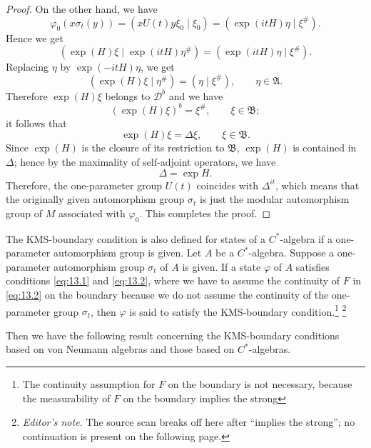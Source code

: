 \documentclass[12pt,b5paper,twoside]{article}
\theoremstyle{takesaki}
\numberwithin{equation}{section}
\newcounter{editorialnote}
\newcommand{\ednote}[1]{%
  \stepcounter{editorialnote}%
  \begingroup
  \renewcommand{\thefootnote}{E\arabic{editorialnote}}%
  \footnote{\textit{Editor's note.} #1}%
  \addtocounter{footnote}{-1}%
  \endgroup
}
\begin{document}
\begin{proof}
On the other hand, we have
\[
 \varphi_0(x\sigma_t(y))
 =(xU(t)y\xi_0\mid\xi_0)
 =(\exp(itH)\eta\mid\xi^{\#}).
\]
Hence we get
\[
 (\exp(H)\xi\mid\exp(itH)\eta^{\#})
 =(\exp(itH)\eta\mid\xi^{\#}).
\]
Replacing $\eta$ by $\exp(-itH)\eta$, we get
\[
 (\exp(H)\xi\mid\eta^{\#})=(\eta\mid\xi^{\#}),
 \qquad \eta\in\mathfrak A.
\]
Therefore $\exp(H)\xi$ belongs to $\mathcal D^b$ and we have
\[
  (\exp(H)\xi)^b=\xi^{\#},
  \qquad \xi\in\mathfrak B;
\]
it follows that
\begin{equation}
  \exp(H)\xi=\Delta\xi,
  \qquad \xi\in\mathfrak B.
  \tag{13.7}\label{eq:13.7}
\end{equation}
Since $\exp(H)$ is the closure of its restriction to $\mathfrak B$,
$\exp(H)$ is contained in $\Delta$; hence by the maximality of
self-adjoint operators, we have
\begin{equation}
  \Delta=\exp H.
  \tag{13.8}\label{eq:13.8}
\end{equation}
Therefore, the one-parameter group $U(t)$ coincides with
$\Delta^{it}$, which means that the originally given automorphism
group $\sigma_t$ is just the modular automorphism group of $M$
associated with $\varphi_0$.  This completes the proof.
\end{proof}

The KMS-boundary condition is also defined for states of a
$C^*$-algebra if a one-parameter automorphism group is given.  Let
$A$ be a $C^*$-algebra.  Suppose a one-parameter automorphism group
$\sigma_t$ of $A$ is given.  If a state $\varphi$ of $A$ satisfies
conditions \eqref{eq:13.1} and \eqref{eq:13.2}, where we have to
assume the continuity of $F$ in \eqref{eq:13.2} on the boundary
because we do not assume the continuity of the one-parameter group
$\sigma_t$, then $\varphi$ is said to satisfy the KMS-boundary
condition.\footnote{The continuity assumption for $F$ on the
boundary is not necessary, because the measurability of $F$ on the
boundary implies the strong}
\ednote{The source scan breaks off here after ``implies the strong'';
no continuation is present on the following page.}
Then we have the following result concerning the KMS-boundary
conditions based on von Neumann algebras and those based on
$C^*$-algebras.
\end{document}
